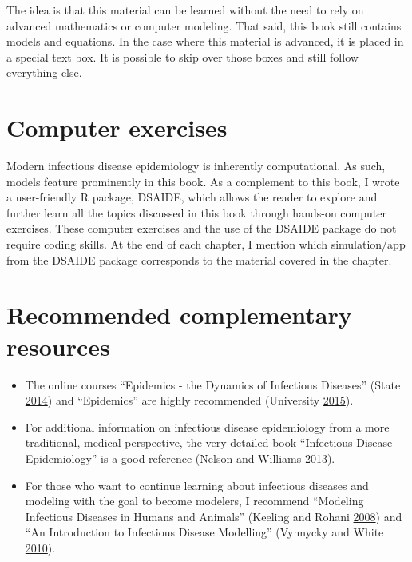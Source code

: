 \documentclass[]{book}
\providecommand{\tightlist}{%
  \setlength{\itemsep}{0pt}\setlength{\parskip}{0pt}}
\theoremstyle{definition}
\theoremstyle{definition}
\theoremstyle{definition}
\theoremstyle{remark}
\begin{document}
The idea is that this material can be learned without the need to rely
on advanced mathematics or computer modeling. That said, this book still
contains models and equations. In the case where this material is
advanced, it is placed in a special text box. It is possible to skip
over those boxes and still follow everything else.

\section{Computer exercises}\label{computer-exercises}

Modern infectious disease epidemiology is inherently computational. As
such, models feature prominently in this book. As a complement to this
book, I wrote a user-friendly R package, DSAIDE, which allows the reader
to explore and further learn all the topics discussed in this book
through hands-on computer exercises. These computer exercises and the
use of the DSAIDE package do not require coding skills. At the end of
each chapter, I mention which simulation/app from the DSAIDE package
corresponds to the material covered in the chapter.

\section{Recommended complementary
resources}\label{recommended-complementary-resources}

\begin{itemize}
\tightlist
\item
  The online courses ``Epidemics - the Dynamics of Infectious Diseases''
  (State \protect\hyperlink{ref-epimooc}{2014}) and ``Epidemics'' are
  highly recommended (University
  \protect\hyperlink{ref-hkepidemics}{2015}).
\item
  For additional information on infectious disease epidemiology from a
  more traditional, medical perspective, the very detailed book
  ``Infectious Disease Epidemiology'' is a good reference (Nelson and
  Williams \protect\hyperlink{ref-nelson13}{2013}).
\item
  For those who want to continue learning about infectious diseases and
  modeling with the goal to become modelers, I recommend ``Modeling
  Infectious Diseases in Humans and Animals'' (Keeling and Rohani
  \protect\hyperlink{ref-keeling08}{2008}) and ``An Introduction to
  Infectious Disease Modelling'' (Vynnycky and White
  \protect\hyperlink{ref-vynnycky10}{2010}).
\end{itemize}
\end{document}
